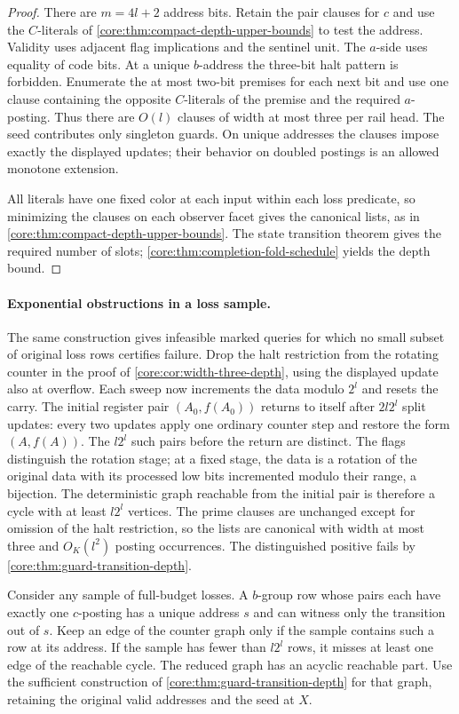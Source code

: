 \begin{proof}
There are $m=4l+2$ address bits. Retain the pair clauses for
$c$ and use the $C$-literals of
\cref{core:thm:compact-depth-upper-bounds} to test the address.
Validity uses adjacent flag implications and the sentinel unit.
The $a$-side uses equality of code bits. At a unique
$b$-address the three-bit halt pattern is forbidden. Enumerate
the at most two-bit premises for each next bit and use one
clause containing the opposite $C$-literals of the premise
and the required $a$-posting. Thus there are $O(l)$ clauses
of width at most three per rail head. The seed contributes only
singleton guards. On unique addresses the clauses impose
exactly the displayed updates; their behavior on doubled
postings is an allowed monotone extension.

All literals have one fixed color at each input within each loss
predicate, so minimizing the clauses on each observer facet gives
the canonical lists, as in \cref{core:thm:compact-depth-upper-bounds}.
The state transition theorem gives the required number of slots;
\cref{core:thm:completion-fold-schedule} yields the depth bound.
\end{proof}

\paragraph{Exponential obstructions in a loss sample.}
The same construction gives infeasible marked
queries for which no small subset of original
loss rows certifies failure. Drop the halt
restriction from the rotating counter in the
proof of \cref{core:cor:width-three-depth}, using
the displayed update also at overflow. Each
sweep now increments the data modulo $2^l$
and resets the carry. The initial register pair
$(A_0,f(A_0))$ returns to itself after
$2l2^l$ split updates: every two updates apply
one ordinary counter step and restore the form
$(A,f(A))$. The $l2^l$ such pairs before the
return are distinct. The flags distinguish
the rotation stage; at a fixed stage, the
data is a rotation of the original data
with its processed low bits incremented
modulo their range, a bijection.
The deterministic graph reachable from the
initial pair is therefore a cycle with at least
$l2^l$ vertices. The prime clauses are unchanged
except for omission of the halt restriction, so
the lists are canonical with width at most
three and $O_K(l^2)$ posting occurrences.
The distinguished positive fails by
\cref{core:thm:guard-transition-depth}.

Consider any sample of full-budget losses. A
$b$-group row whose pairs each have exactly
one $c$-posting has a unique address $s$ and
can witness only the transition out of $s$.
Keep an edge of the counter graph only if the
sample contains such a row at its address.
If the sample has fewer than $l2^l$ rows, it
misses at least one edge of the reachable
cycle. The reduced graph has an acyclic
reachable part. Use the sufficient construction
of \cref{core:thm:guard-transition-depth} for
that graph, retaining the original valid
addresses and the seed at $X$.

